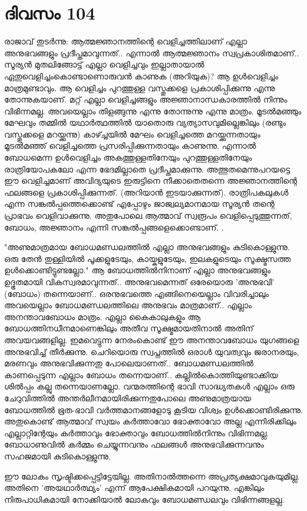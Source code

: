 \newpage
\section{ദിവസം 104}


രാജാവ്‌ തുടര്‍ന്നു: ആത്മജ്ഞാനത്തിന്റെ വെളിച്ചത്തിലാണ്‌ എല്ലാ അനുഭവങ്ങളും പ്രദീപ്തമാവുന്നത്‌.. എന്നാല്‍ ആത്മജ്ഞാനം സ്വപ്രകാശിതമാണ്‌.. സൂര്യന്‍ മുതലിങ്ങോട്ട്‌ എല്ലാ വെളിച്ചവും ഇല്ലാതായാല്‍ ഏതുവെളിച്ചംകൊണ്ടാണൊരുവന്‍ കാണുക (അറിയുക)? ആ ഉള്‍വെളിച്ചം മാത്രമുണ്ടാവും. ആ വെളിച്ചം പുറത്തുള്ള വസ്തുക്കളെ പ്രകാശിപ്പിക്കുന്നു എന്നു തോന്നുകയാണ്‌. മറ്റ്‌ എല്ലാ വെളിച്ചങ്ങളും അജ്ഞാനാന്ധകാരത്തില്‍ നിന്നും വിഭിന്നമല്ല. അവയെല്ലാം തിളങ്ങുന്നു എന്നു തോന്നുന്നു എന്നു മാത്രം. മൂടല്‍മഞ്ഞും മേഘവും തമ്മില്‍ യഥാര്‍ത്ഥത്തില്‍ യാതൊരു വ്യത്യാസവുമില്ലെങ്കിലും (രണ്ടും വസ്തുക്കളെ മറയ്ക്കുന്നു) കാഴ്ച്ചയില്‍ മേഘം വെളിച്ചത്തെ മറയ്ക്കുന്നതായും മൂടല്‍മഞ്ഞ്‌ വെളിച്ചത്തെ പ്രസരിപ്പിക്കുന്നതായും കാണുന്നു. എന്നാല്‍ ബോധമെന്ന ഉള്‍വെളിച്ചം അകത്തുള്ളതിനേയും പുറത്തുള്ളതിനേയും രാത്രിയോപകലോ എന്ന ഭേദമില്ലാതെ പ്രദീപ്തമാക്കുന്നു. അത്ഭുതമെന്നുപറയട്ടെ ഈ വെളിച്ചമാണ്‌ അവിദ്യയുടെ ഇരുട്ടിനെ നീക്കാതെതന്നെ അജ്ഞാനത്തിന്റെ ഫലങ്ങളെ പ്രകാശിപ്പിക്കുന്നത്‌. (അറിയാന്‍ ഇടയാക്കുന്നത്‌). രാത്രിപകലുകള്‍ എന്ന സങ്കല്‍പ്പത്തെക്കൊണ്ട്‌ എപ്പോഴും ജാജ്വല്യമാനമായ സൂര്യന്‍ തന്റെ പ്രാഭവം വെളിവാക്കുന്നു. അതുപോലെ ആത്മാവ്‌ സ്വരൂപം വെളിപ്പെടുത്തുന്നത്‌, ബോധം, അജ്ഞാനം എന്നി സങ്കല്‍പ്പങ്ങളെക്കൊണ്ടാണ്‌. .

"അണുമാത്രമായ ബോധമണ്ഡലത്തില്‍ എല്ലാ അനുഭവങ്ങളും കുടികൊള്ളുന്നു. ഒരു തേന്‍ തുള്ളിയില്‍ പൂക്കളുടേയും, കായ്കളുടേയും, ഇലകളുടെയും സൂക്ഷ്മസത്ത ഉള്‍ക്കൊണ്ടിട്ടുണ്ടല്ലോ." ആ ബോധത്തില്‍നിനാണ്‌ എല്ലാ  അനുഭവങ്ങളും ഉദ്ഭൂതമായി വികസ്വരമാവുന്നത്‌.. അനുഭവമെന്നത്‌ ഒരേയൊരു 'അനുഭവി' (ബോധം) തന്നെയാണ്‌.. ഒരനുഭവത്തെ എങ്ങിനെയെല്ലാം വിവരിച്ചാലും അവയെല്ലാം ബോധമണ്ഡലത്തിലെ അനുഭവം മാത്രമാണ്‌.. എല്ലാം അനന്താവബോധം മാത്രം. എല്ലാ കൈകാലുകളും ആ ബോധത്തിനധീനമാണെങ്കിലും അതീവ സൂക്ഷ്മമായതിനാല്‍ അതിന്‌ അവയവങ്ങളില്ല. ഇമവെട്ടുന്ന നേരംകൊണ്ട്‌ ഈ അനന്താവബോധം യുഗങ്ങളെ അനുഭവിച്ച്‌ തീര്‍ക്കുന്നു. ചെറിയൊരു സ്വപ്നത്തില്‍ ഒരാള്‍ യുവത്വവും ജരാനരയും, മരണവും അനുഭവിക്കുന്നതു പോലെയാണത്‌.. ബോധമണ്ഡലത്തില്‍ കാണപ്പെടുന്ന എല്ലാം ബോധം തന്നെയാണ്‌.. കല്ലില്‍കൊത്തിയുണ്ടാക്കിയ ശില്‍പ്പം കല്ലു തന്നെയാണല്ലോ. വന്മരത്തിന്റെ ഭാവി സാദ്ധ്യതകള്‍ എല്ലാം ഒരു ചേറുവിത്തില്‍ അന്തര്‍ലീനമായിരിക്കുന്നതുപോലെ അണുമാത്രയായ ബോധത്തില്‍ ഭൂത-ഭാവി വര്‍ത്തമാനങ്ങളോടു കൂടിയ വിശ്വം ഉള്‍ക്കൊണ്ടിരിക്കുന്നു. അതുകൊണ്ട്‌ ആത്മാവ്‌ സ്വയം കര്‍ത്താവോ ഭോക്താവോ അല്ല എന്നിരിക്കിലും എല്ലാറ്റിന്റേയും കര്‍ത്താവും ഭോക്താവും ബോധത്തില്‍നിന്നും വിഭിന്നമല്ല. ബോധാണുവില്‍ കര്‍മ്മം ചെയ്യുന്നവനും ഫലങ്ങള്‍ അനുഭവിക്കുന്നവനും സഹജമായി കുടികൊള്ളുന്നു.

ഈ ലോകം സൃഷ്ടിക്കപ്പെട്ടിട്ടേയില്ല. അതിനാല്‍ത്തന്നെ അപ്രത്യക്ഷമാവുകയുമില്ല. അതിനെ 'അയഥാര്‍ത്ഥ്യം' എന്ന് ആപേക്ഷികമായി പറയുന്നു. എങ്കിലും നിരുപാധികമായി നോക്കിയാല്‍ ലോകവും ബോധമണ്ഡലവും വിഭിന്നങ്ങളല്ല. 
